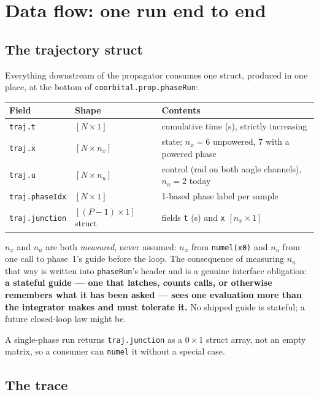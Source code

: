 \documentclass[11pt]{article}
\newcommand{\code}[1]{\texttt{#1}}
\begin{document}
\section{Data flow: one run end to end}
\label{sec:flow}

\subsection{The trajectory struct}

Everything downstream of the propagator consumes one struct, produced in one
place, at the bottom of \code{coorbital.prop.phaseRun}:

\begin{center}
\begin{tabular}{lll}
\toprule
Field & Shape & Contents \\
\midrule
\code{traj.t}        & $[N\times1]$        & cumulative time (s), strictly increasing \\
\code{traj.x}        & $[N\times n_x]$     & state; $n_x = 6$ unpowered, $7$ with a powered phase \\
\code{traj.u}        & $[N\times n_u]$     & control (rad on both angle channels), $n_u = 2$ today \\
\code{traj.phaseIdx} & $[N\times1]$        & 1-based phase label per sample \\
\code{traj.junction} & $[(P-1)\times1]$ struct & fields \code{t} (s) and \code{x} $[n_x\times1]$ \\
\bottomrule
\end{tabular}
\end{center}

$n_x$ and $n_u$ are both \emph{measured}, never assumed: $n_x$ from
\code{numel(x0)} and $n_u$ from one call to phase~1's guide before the loop.
The consequence of measuring $n_u$ that way is written into \code{phaseRun}'s
header and is a genuine interface obligation: \textbf{a stateful guide --- one
that latches, counts calls, or otherwise remembers what it has been asked ---
sees one evaluation more than the integrator makes and must tolerate it.} No
shipped guide is stateful; a future closed-loop law might be.

A single-phase run returns \code{traj.junction} as a $0\times1$ struct array,
not an empty matrix, so a consumer can \code{numel} it without a special case.

\subsection{The trace}
\end{document}
